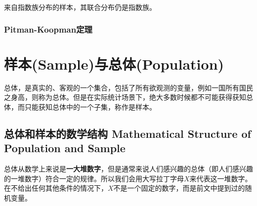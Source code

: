 \documentclass[UTF8]{ctexbook}
\begin{document}
来自指数族分布的样本，其联合分布仍是指数族。
\subsection{Pitman-Koopman定理}
%
%
\chapter{样本(Sample)与总体(Population)}
总体，是真实的、客观的一个集合，包括了所有欲观测的变量，例如一国所有国民之身高，则称为总体。但是在实际统计场景下，绝大多数时候都不可能获得获知总体，而只能获知总体中的一个子集，称作是样本。

\section{总体和样本的数学结构 Mathematical Structure of Population and Sample}
总体从数学上来说是\textbf{一大堆数字}，但是通常来说人们感兴趣的总体（即人们感兴趣的一堆数字）符合一定的规律。所以我们会用大写拉丁字母$X$来代表这一堆数字。在不给出任何其他条件的情况下，$X$不是一个固定的数字，而是前文中提到过的随机变量。
\end{document}
